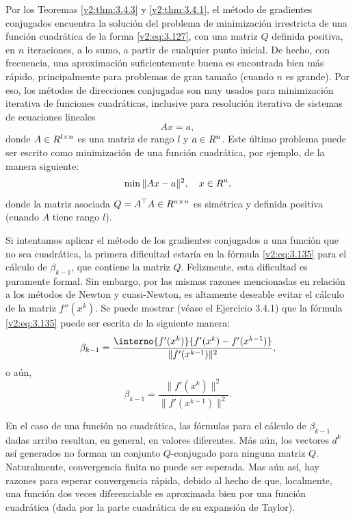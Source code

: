 Por los Teoremas \ref{v2:thm:3.4.3} y \ref{v2:thm:3.4.1}, el método de gradientes conjugados encuentra la solución del problema de minimización irrestricta de una función cuadrática de la forma \eqref{v2:eq:3.127}, con una matriz $Q$ definida positiva, en $n$ iteraciones, a lo sumo, a partir de cualquier punto inicial. De hecho, con frecuencia, una aproximación suficientemente buena es encontrada bien más rápido, principalmente para problemas de gran tamaño (cuando $n$ es grande). Por eso, los métodos de direcciones conjugadas son muy usados para minimización iterativa de funciones cuadráticas, inclusive para resolución iterativa de sistemas de ecuaciones lineales
\[
    Ax = a,
\]
donde $A \in R^{l \times n}$ es una matriz de rango $l$ y $a \in R^n$. Este último problema puede ser escrito como minimización de una función cuadrática, por ejemplo, de la manera siguiente:
\[
    \min \|Ax - a\|^2, \quad x \in R^n,
\]
donde la matriz asociada $Q = A^\top A \in R^{n \times n}$ es simétrica y definida positiva (cuando $A$ tiene rango $l$).

Si intentamos aplicar el método de los gradientes conjugados a una función que no sea cuadrática, la primera dificultad estaría en la fórmula \eqref{v2:eq:3.135} para el cálculo de $\beta_{k-1}$, que contiene la matriz $Q$. Felizmente, esta dificultad es puramente formal. Sin embargo, por las mismas razones mencionadas en relación a los métodos de Newton y cuasi-Newton, es altamente deseable evitar el cálculo de la matriz $f''(x^k)$. Se puede mostrar (véase el Ejercicio 3.4.1) que la fórmula \eqref{v2:eq:3.135} puede ser escrita de la siguiente manera:
\begin{equation*}
    \beta_{k-1} = \frac{\interno{f'(x^k)}{f'(x^k) - f'(x^{k-1})}}{\|f'(x^{k-1})\|^2},
\end{equation*}
o aún,
\begin{equation*}
    \beta_{k-1} = \frac{\|f'(x^k)\|^2}{\|f'(x^{k-1})\|^2}.
\end{equation*}

En el caso de una función no cuadrática, las fórmulas para el cálculo de $\beta_{k-1}$ dadas arriba resultan, en general, en valores diferentes. Más aún, los vectores $d^k$ así generados no forman un conjunto $Q$-conjugado para ninguna matriz $Q$. Naturalmente, convergencia finita no puede ser esperada. Mas aún así, hay razones para esperar convergencia rápida, debido al hecho de que, localmente, una función dos veces diferenciable es aproximada bien por una función cuadrática (dada por la parte cuadrática de su expansión de Taylor).

